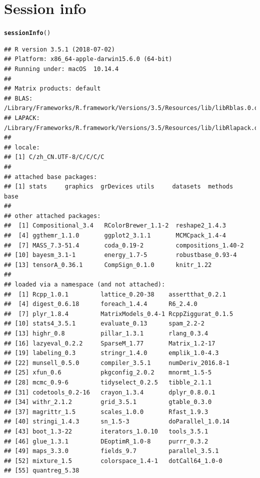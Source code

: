 \documentclass{article}\usepackage[]{graphicx}\usepackage[]{color}
\makeatletter
\newcommand{\hlstd}[1]{\textcolor[rgb]{0.345,0.345,0.345}{#1}}%
\newcommand{\hlkwd}[1]{\textcolor[rgb]{0.737,0.353,0.396}{\textbf{#1}}}%
\newenvironment{kframe}{%
 \def\at@end@of@kframe{}%
 \ifinner\ifhmode%
  \def\at@end@of@kframe{\end{minipage}}%
  \begin{minipage}{\columnwidth}%
 \fi\fi%
 \def\FrameCommand##1{\hskip\@totalleftmargin \hskip-\fboxsep
 \colorbox{shadecolor}{##1}\hskip-\fboxsep
     \hskip-\linewidth \hskip-\@totalleftmargin \hskip\columnwidth}%
 \MakeFramed {\advance\hsize-\width
   \@totalleftmargin\z@ \linewidth\hsize
   \@setminipage}}%
 {\par\unskip\endMakeFramed%
 \at@end@of@kframe}
\newenvironment{knitrout}{}{} %
\makeatother
\begin{document}
\clearpage

\clearpage
\printbibliography

\clearpage
\section{Session info}
\begin{knitrout}
\color{fgcolor}\begin{kframe}
\begin{alltt}
  \hlkwd{sessionInfo}\hlstd{()}
\end{alltt}
\begin{verbatim}
## R version 3.5.1 (2018-07-02)
## Platform: x86_64-apple-darwin15.6.0 (64-bit)
## Running under: macOS  10.14.4
## 
## Matrix products: default
## BLAS: /Library/Frameworks/R.framework/Versions/3.5/Resources/lib/libRblas.0.dylib
## LAPACK: /Library/Frameworks/R.framework/Versions/3.5/Resources/lib/libRlapack.dylib
## 
## locale:
## [1] C/zh_CN.UTF-8/C/C/C/C
## 
## attached base packages:
## [1] stats     graphics  grDevices utils     datasets  methods   base     
## 
## other attached packages:
##  [1] Compositional_3.4   RColorBrewer_1.1-2  reshape2_1.4.3     
##  [4] ggthemr_1.1.0       ggplot2_3.1.1       MCMCpack_1.4-4     
##  [7] MASS_7.3-51.4       coda_0.19-2         compositions_1.40-2
## [10] bayesm_3.1-1        energy_1.7-5        robustbase_0.93-4  
## [13] tensorA_0.36.1      CompSign_0.1.0      knitr_1.22         
## 
## loaded via a namespace (and not attached):
##  [1] Rcpp_1.0.1         lattice_0.20-38    assertthat_0.2.1  
##  [4] digest_0.6.18      foreach_1.4.4      R6_2.4.0          
##  [7] plyr_1.8.4         MatrixModels_0.4-1 RcppZiggurat_0.1.5
## [10] stats4_3.5.1       evaluate_0.13      spam_2.2-2        
## [13] highr_0.8          pillar_1.3.1       rlang_0.3.4       
## [16] lazyeval_0.2.2     SparseM_1.77       Matrix_1.2-17     
## [19] labeling_0.3       stringr_1.4.0      emplik_1.0-4.3    
## [22] munsell_0.5.0      compiler_3.5.1     numDeriv_2016.8-1 
## [25] xfun_0.6           pkgconfig_2.0.2    mnormt_1.5-5      
## [28] mcmc_0.9-6         tidyselect_0.2.5   tibble_2.1.1      
## [31] codetools_0.2-16   crayon_1.3.4       dplyr_0.8.0.1     
## [34] withr_2.1.2        grid_3.5.1         gtable_0.3.0      
## [37] magrittr_1.5       scales_1.0.0       Rfast_1.9.3       
## [40] stringi_1.4.3      sn_1.5-3           doParallel_1.0.14 
## [43] boot_1.3-22        iterators_1.0.10   tools_3.5.1       
## [46] glue_1.3.1         DEoptimR_1.0-8     purrr_0.3.2       
## [49] maps_3.3.0         fields_9.7         parallel_3.5.1    
## [52] mixture_1.5        colorspace_1.4-1   dotCall64_1.0-0   
## [55] quantreg_5.38
\end{verbatim}
\end{kframe}
\end{knitrout}
\end{document}
